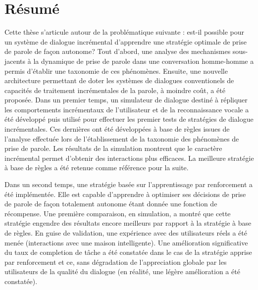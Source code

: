 \chapter*{R\'esum\'e}

     Cette th\`ese s'articule autour de la probl\'ematique suivante : est-il possible pour un syst\`eme de dialogue incr\'emental d'apprendre une strat\'egie optimale de prise de parole de fa\c con autonome? Tout d'abord, une analyse des mechanismes sous-jacents \`a la dynamique de prise de parole dans une conversation homme-homme a permis d'\'etablir une taxonomie de ces ph\'enom\`enes. Ensuite, une nouvelle architecture permettant de doter les syst\`emes de dialogues conventionels de capacit\'es de traitement incr\'ementales de la parole, \`a moindre co\^ut, a \'et\'e propos\'ee. Dans un premier temps, un simulateur de dialogue destin\'e \`a r\'epliquer les comportements incr\'ementaux de l'utilisateur et de la reconnaissance vocale a \'et\'e d\'evelopp\'e puis utilis\'e pour effectuer les premier tests de strat\'egies de dialogue incr\'ementales. Ces derni\`eres ont \'et\'e d\'evelopp\'ees \`a base de r\`egles issues de l'analyse effectu\'ee lors de l'\'etablissement de la taxonomie des ph\'enom\`enes de prise de parole. Les r\'esultats de la simulation montrent que le caract\`ere incr\'emental permet d'obtenir des interactions plus efficaces. La meilleure strat\'egie \`a base de r\`egles a \'et\'e retenue comme r\'ef\'erence pour la suite.

     Dans un second temps, une strat\'egie bas\'ee sur l'apprentissage par renforcement a \'et\'e impl\'ement\'ee. Elle est capable d'apprendre \`a optimiser ses d\'ecisions de prise de parole de fa\c con totalement autonome \'etant donn\'ee une fonction de r\'ecompense. Une premi\`ere comparaison, en simulation, a montr\'e que cette strat\'egie engendre des r\'esultats encore meilleurs par rapport \`a la strat\'egie \`a base de r\`egles. En guise de validation, une exp\'erience avec des utilisateurs r\'eels a \'et\'e men\'ee (interactions avec une maison intelligente). Une am\'elioration significative du taux de completion de t\^ache a \'et\'e constat\'ee dans le cas de la strat\'egie apprise par renforcement et ce, sans d\'egradation de l'appreciation globale par les utilisateurs de la qualit\'e du dialogue (en r\'ealit\'e, une l\'eg\`ere am\'elioration a \'et\'e constat\'ee).
